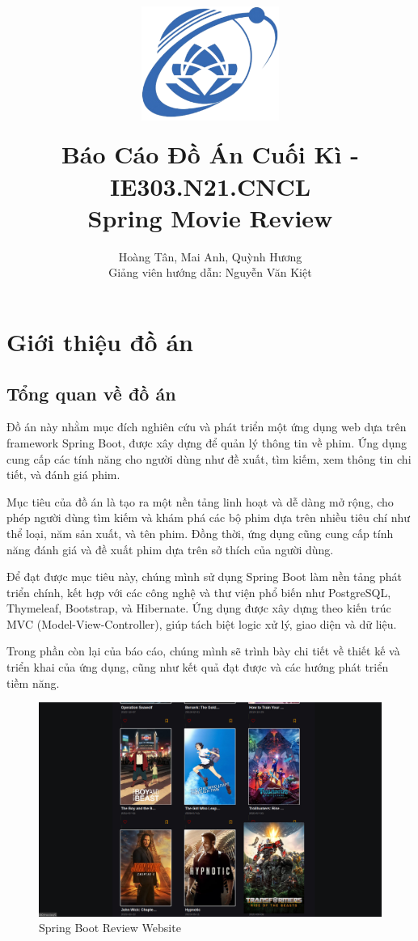 \documentclass[12pt]{article}
\title{
{\includegraphics[width=4.5cm, height=4.5cm]{Figs/logo-uit-300x248.png}
}
\\
{Báo Cáo Đồ Án Cuối Kì - IE303.N21.CNCL \\ Spring Movie Review}
}
\author{Hoàng Tân, Mai Anh, Quỳnh Hương \\ Giảng viên hướng dẫn: Nguyễn Văn Kiệt }
\begin{document}
\maketitle
\tableofcontents
\section{Giới thiệu đồ án}
\subsection{Tổng quan về đồ án}
Đồ án này nhằm mục đích nghiên cứu và phát triển một ứng dụng web dựa trên framework Spring Boot, được xây dựng để quản lý thông tin về phim. Ứng dụng cung cấp các tính năng cho người dùng như đề xuất, tìm kiếm, xem thông tin chi tiết, và đánh giá phim.

Mục tiêu của đồ án là tạo ra một nền tảng linh hoạt và dễ dàng mở rộng, cho phép người dùng tìm kiếm và khám phá các bộ phim dựa trên nhiều tiêu chí như thể loại, năm sản xuất, và tên phim. Đồng thời, ứng dụng cũng cung cấp tính năng đánh giá và đề xuất phim dựa trên sở thích của người dùng.

Để đạt được mục tiêu này, chúng mình sử dụng Spring Boot làm nền tảng phát triển chính, kết hợp với các công nghệ và thư viện phổ biến như PostgreSQL, Thymeleaf, Bootstrap, và Hibernate. Ứng dụng được xây dựng theo kiến trúc MVC (Model-View-Controller), giúp tách biệt logic xử lý, giao diện và dữ liệu.

Trong phần còn lại của báo cáo, chúng mình sẽ trình bày chi tiết về thiết kế và triển khai của ứng dụng, cũng như kết quả đạt được và các hướng phát triển tiềm năng.

\begin{figure}[H]
    \centering
    \includegraphics[scale=0.35]{Figs/Project_Review.png}
    \caption{Spring Boot Review Website}
\end{figure}
\end{document}
